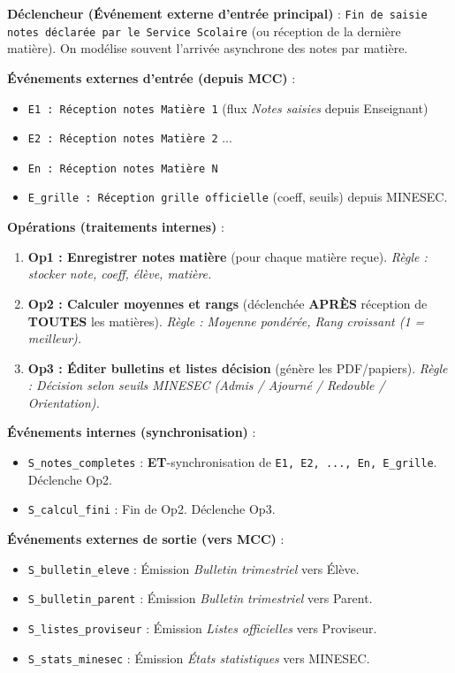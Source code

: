 \documentclass[11pt]{article}
\begin{document}
\begin{exemplebox}
\textbf{Déclencheur (Événement externe d'entrée principal)} : \texttt{Fin de saisie notes déclarée par le Service Scolaire} (ou réception de la dernière matière). On modélise souvent l'arrivée asynchrone des notes par matière.

\textbf{Événements externes d'entrée (depuis MCC)} :
\begin{itemize}
    \item \texttt{E1 : Réception notes Matière 1} (flux \emph{Notes saisies} depuis Enseignant)
    \item \texttt{E2 : Réception notes Matière 2} ...
    \item \texttt{En : Réception notes Matière N}
    \item \texttt{E\_grille : Réception grille officielle} (coeff, seuils) depuis MINESEC.
\end{itemize}

\textbf{Opérations (traitements internes)} :
\begin{enumerate}
    \item \textbf{Op1 : Enregistrer notes matière} (pour chaque matière reçue). \emph{Règle : stocker note, coeff, élève, matière.}
    \item \textbf{Op2 : Calculer moyennes et rangs} (déclenchée \textbf{APRÈS} réception de \textbf{TOUTES} les matières). \emph{Règle : Moyenne pondérée, Rang croissant (1 = meilleur).}
    \item \textbf{Op3 : Éditer bulletins et listes décision} (génère les PDF/papiers). \emph{Règle : Décision selon seuils MINESEC (Admis / Ajourné / Redouble / Orientation).}
\end{enumerate}

\textbf{Événements internes (synchronisation)} :
\begin{itemize}
    \item \texttt{S\_notes\_completes} : \textbf{ET}-synchronisation de \texttt{E1, E2, ..., En, E\_grille}. Déclenche Op2.
    \item \texttt{S\_calcul\_fini} : Fin de Op2. Déclenche Op3.
\end{itemize}

\textbf{Événements externes de sortie (vers MCC)} :
\begin{itemize}
    \item \texttt{S\_bulletin\_eleve} : Émission \emph{Bulletin trimestriel} vers Élève.
    \item \texttt{S\_bulletin\_parent} : Émission \emph{Bulletin trimestriel} vers Parent.
    \item \texttt{S\_listes\_proviseur} : Émission \emph{Listes officielles} vers Proviseur.
    \item \texttt{S\_stats\_minesec} : Émission \emph{États statistiques} vers MINESEC.
\end{itemize}
\end{exemplebox}
\end{document}
